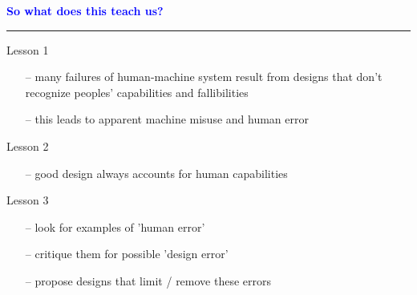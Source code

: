 \documentclass[pdf]{beamer}
\begin{document}
\begin{frame}
    \textcolor{Blue}{\textbf{\Large{So what does this teach us?}}}
    \textcolor{red}{\rule{10cm}{1mm}}

\vspace{5mm}

    {\large \textcolor{black}{}Lesson 1}
    {\begin{itemize}
      \item[\textcolor{black}{--}] {\normalsize many failures of human-machine system result from designs that don’t recognize peoples’ capabilities and fallibilities}
      \item[\textcolor{black}{--}] {\normalsize this leads to apparent machine misuse and human error}
      \newline
    \end{itemize}}
    
    {\large \textcolor{black}{}Lesson 2}
    {\begin{itemize}
      \item[\textcolor{black}{--}] {\normalsize good design always accounts for human capabilities}
      \newline
    \end{itemize}}
    
    {\large \textcolor{black}{}Lesson 3}
    {\begin{itemize}
      \item[\textcolor{black}{--}] {\normalsize look for examples of 'human error'}
      \item[\textcolor{black}{--}] {\normalsize critique them for possible 'design error'}
      \item[\textcolor{black}{--}] {\normalsize propose designs that limit / remove these errors}
      \newline
    \end{itemize}}
\end{frame}
\end{document}
